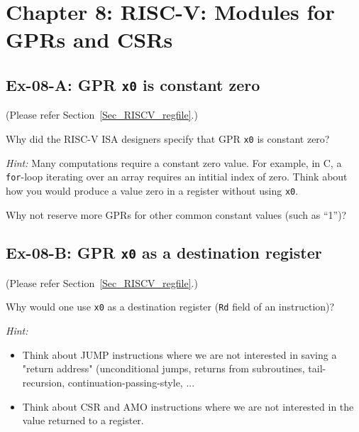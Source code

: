
\hdivider

\section*{Chapter 8: RISC-V: Modules for GPRs and CSRs}


\subsection*{Ex-08-A: GPR {\tt x0} is constant zero}
\label{Ex-08-A-GPR-x0}

(Please refer Section~\ref{Sec_RISCV_regfile}.)

Why did the RISC-V ISA designers specify that GPR {\tt x0} is constant zero?

\emph{Hint:} Many computations require a constant zero value.  For
example, in C, a {\tt for}-loop iterating over an array requires an
intitial index of zero.  Think about how you would produce a value
zero in a register without using {\tt x0}.

Why not reserve more GPRs for other common constant values (such as ``1'')?


\subsection*{Ex-08-B: GPR {\tt x0} as a destination register}
\label{Ex-08-B-GPR-x0-as-Rd}

(Please refer Section~\ref{Sec_RISCV_regfile}.)

Why would one use {\tt x0} as a destination register ({\tt Rd} field of an instruction)?

\emph{Hint:}
\begin{itemize}

 \item Think about JUMP instructions where we are not interested in
       saving a "return address" (unconditional jumps, returns from
       subroutines, tail-recursion, continuation-passing-style, ...

 \item Think about CSR and AMO instructions where we are not
       interested in the value returned to a register.

\end{itemize}

